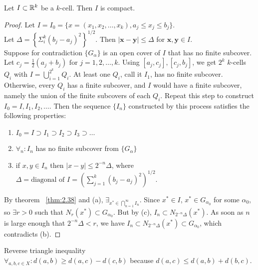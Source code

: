 \begin{thm}[40]
	Let $I \subset \mathbb{R} ^{k}$ be a $k$-cell. Then $I$ is compact.
	\begin{proof}
		Let $I=I_0=\{x=(x_1,x_2, \ldots ,x_k), a_j \le x_j \le b_j\}$.\\
		Let $\Delta=\left\{\Sigma_{i}^{k}(b_j - a_j)^{2}  \right\}^{1/2}$. Then $|\mathbf{x}-\mathbf{y}|\le \Delta$ for $\mathbf{x,y} \in I$.\\
		Suppose for contradiction $\{G_{\alpha}\}$ is an open cover of $I$ that has no finite subcover.\\
		Let $c_j=\frac{1}{2}(a_j + b_j) \text{ for }  j=1,2, \ldots ,k$.
		Using $[a_j,c_j], [c_j,b_j]$, we get $2^{k}$ $k$-cells $Q_i$ with $I=\bigcup_{i=1}^{2^{k}}Q_i$.
		At least one $Q_i$, call it $I_1$, has no finite subcover. Otherwise, every $Q_i$ has a finite subcover, and $I$ would have a finite subcover, namely the union of the finite subcovers of each $Q_i$.
		Repeat this step to construct $I_0=I,I_1,I_2, \ldots $.
		Then the sequence $\{I_n\}$ constructed by this process satisfies the following properties:
		\begin{enumerate}
			\item $I_0=I \supset I_1 \supset I_2 \supset I_3 \supset \ldots $
			\item $\forall_{n}: I_n$ has no finite subcover from $\{G_{\alpha}\}$
			\item if $x,y \in I_n$ then $|x-y|\le  2^{-n}\Delta$, where $\Delta= \text{diagonal of }I=\left( \sum_{j=1}^{k}{(b_j-a_j)^2} \right)^{1/2}$.
		\end{enumerate}
		By theorem ~\ref{thm:2.38} and (a), $\exists_{x^{*} \in \bigcap_{n=1}^{\infty}I_n }$.
		Since $x^{*} \in  I$, $x^{*} \in G_{\alpha_0}$ for some $\alpha_0$, so $\exists r>0$ such that $N_r(x^{*}) \subset G_{\alpha_0}$. But by (c), $I_n \subset N_{2^{-n}\Delta}(x^{*})$. As soon as $n$ is large enough that $2^{-n} \Delta <r$, we have $I_n \subset N_{2^{-n}\Delta}(x^{*}) \subset G_{\alpha_0}$, which contradicts (b).
	\end{proof}
\end{thm}

\begin{note}
	Reverse triangle inequality\\
	$\forall_{a,b,c \in X}: d(a,b)\ge d(a,c)-d(c,b)$ because $d(a,c)\le d(a,b)+d(b,c)$.
\end{note}

